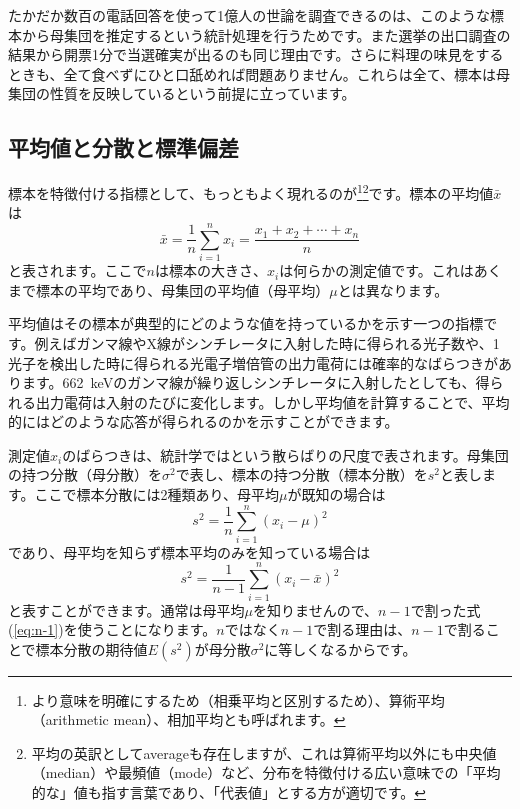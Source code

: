 たかだか数百の電話回答を使って1億人の世論を調査できるのは、このような標本から母集団を推定するという統計処理を行うためです。また選挙の出口調査の結果から開票1分で当選確実が出るのも同じ理由です。さらに料理の味見をするときも、全て食べずにひと口舐めれば問題ありません。これらは全て、標本は母集団の性質を反映しているという前提に立っています。

\subsection{平均値と分散と標準偏差}

標本を特徴付ける指標として、もっともよく現れるのが\footnote{より意味を明確にするため（相乗平均と区別するため）、算術平均（arithmetic mean）、相加平均とも呼ばれます。}\footnote{平均の英訳としてaverageも存在しますが、これは算術平均以外にも中央値（median）や最頻値（mode）など、分布を特徴付ける広い意味での「平均的な」値も指す言葉であり、「代表値」とする方が適切です。}です。標本の平均値$\bar{x}$は
\begin{equation}
  \bar{x} = \frac{1}{n}\sum_{i=1}^n x_i = \frac{x_1 + x_2 + \cdots + x_n}{n}
\end{equation}
と表されます。ここで$n$は標本の大きさ、$x_i$は何らかの測定値です。これはあくまで標本の平均であり、母集団の平均値（母平均）$\mu$とは異なります。

平均値はその標本が典型的にどのような値を持っているかを示す一つの指標です。例えばガンマ線やX線がシンチレータに入射した時に得られる光子数や、1光子を検出した時に得られる光電子増倍管の出力電荷には確率的なばらつきがあります。662~keVのガンマ線が繰り返しシンチレータに入射したとしても、得られる出力電荷は入射のたびに変化します。しかし平均値を計算することで、平均的にはどのような応答が得られるのかを示すことができます。

測定値$x_i$のばらつきは、統計学ではという散らばりの尺度で表されます。母集団の持つ分散（母分散）を$\sigma^2$で表し、標本の持つ分散（標本分散）を$s^2$と表します。ここで標本分散には2種類あり、母平均$\mu$が既知の場合は
\begin{equation}
  s^2 = \frac{1}{n}\sum_{i=1}^n (x_i - \mu)^2
\end{equation}
であり、母平均を知らず標本平均のみを知っている場合は
\begin{equation}
  s^2 = \frac{1}{n-1}\sum_{i=1}^n (x_i - \bar{x})^2
  \label{eq:n-1}
\end{equation}
と表すことができます。通常は母平均$\mu$を知りませんので、$n-1$で割った式(\ref{eq:n-1})を使うことになります。$n$ではなく$n-1$で割る理由は、$n-1$で割ることで標本分散の期待値$E(s^2)$が母分散$\sigma^2$に等しくなるからです。

